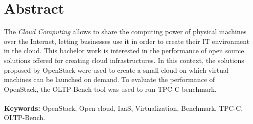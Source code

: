 \documentclass[a4paper, 12pt, oneside, titlepage]{scrbook}
\begin{document}


\chapter*{Abstract}
\thispagestyle{plain}
The \textit{Cloud Computing} allows to share the computing power of physical machines over the Internet, letting businesses use it in order to create their IT environment in the cloud.
This bachelor work is interested in the performance of open source solutions offered for creating cloud infrastructures.
In this context, the solutions proposed by OpenStack were used to create a small cloud on which virtual machines can be launched on demand.
To evaluate the performance of OpenStack, the OLTP-Bench tool was used to run TPC-C benchmark.
\\
\\
{\bf Keywords:} OpenStack, Open cloud, IaaS, Virtualization, Benchmark, TPC-C, OLTP-Bench.

\clearpage 
\tableofcontents
\listoffigures
\listoftables
\clearpage 
\onehalfspace

































% 
% 

















\end{document}
